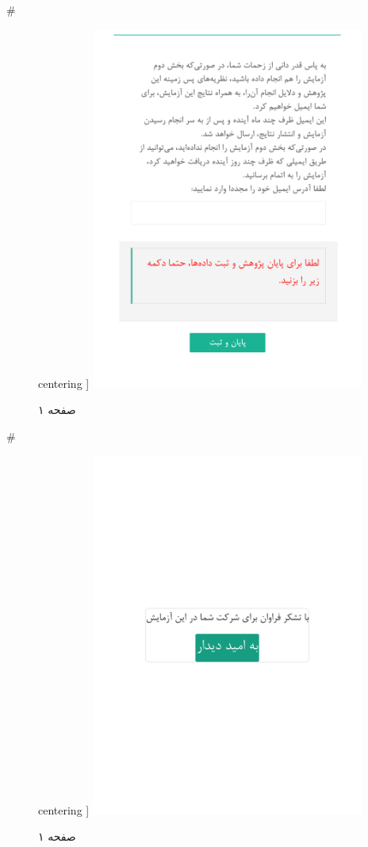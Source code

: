 { 
 # 
\begin{figure}[htpb]
centering ]
\includegraphics[width=0.8\textwidth]{./img/Task76.png/}
\caption{صفحه ۱}
\label{fig:Task1}
\end{figure}
 
 
 # 
\begin{figure}[htpb]
centering ]
\includegraphics[width=0.8\textwidth]{./img/Task77.png/}
\caption{صفحه ۱}
\label{fig:Task1}
\end{figure}
 
}
